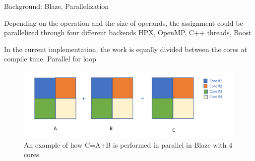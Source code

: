 \documentclass[10pt]{beamer}
\begin{document}
\begin{frame}{Background: Blaze, Parallelization}
	\begin{outline}
		Depending on the operation and the size of operands, the assignment could be parallelized through four different backends
		\1HPX, OpenMP, C++ threads, Boost
		


		In the current implementation, the work is equally divided between the cores at compile time. 
		\1Parallel for loop
		\begin{figure}
			\centering
			\includegraphics[width=0.72\linewidth]{images/old_backend.png}
			\caption{An example of how C=A+B is performed in parallel in Blaze with 4 cores}	
		\end{figure}	

	\end{outline}
\end{frame}

\end{document}
